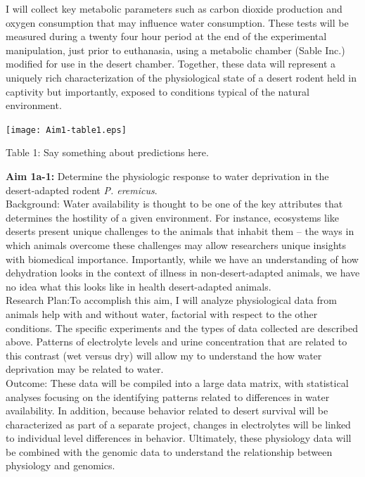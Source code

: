 \documentclass[11pt]{article}
\begin{document}
I will collect key metabolic parameters such as carbon dioxide production and oxygen consumption that may influence water consumption. These tests will be measured during a twenty four hour period at the end of the experimental manipulation, just prior to euthanasia, using a metabolic chamber (Sable Inc.) modified for use in the desert chamber. Together, these data will represent a uniquely rich characterization of the physiological state of a desert rodent held in captivity but importantly, exposed to conditions typical of the natural environment. \\


  \begin{center}
    \texttt{[image: Aim1-table1.eps]}
  \end{center}  

\noindent \small{Table 1: Say something about predictions here.}

\vspace{5mm}


\noindent \textbf{Aim 1a-1:} Determine the physiologic response to water deprivation in the desert-adapted rodent \textit{P. eremicus}. \\


Background: Water availability is thought to be one of the key attributes that determines the hostility of a given environment. For instance, ecosystems like deserts present unique challenges to the animals that inhabit them -- the ways in which animals overcome these challenges may allow researchers unique insights with biomedical importance. Importantly, while we have an understanding of how dehydration looks in the context of illness in non-desert-adapted animals, we have no idea what this looks like in health desert-adapted animals. \\


Research Plan:To accomplish this aim, I will analyze physiological data from animals help with and without water, factorial with respect to the other conditions. The specific experiments and the types of data collected are described above. Patterns of electrolyte levels and urine concentration that are related to this contrast (wet versus dry) will allow my to understand the how water deprivation may be related to water.   \\

Outcome: These data will be compiled into a large data matrix, with statistical analyses focusing on the identifying patterns related to differences in water availability. In addition, because behavior related to desert survival will be characterized as part of a separate project, changes in electrolytes will be linked to individual level differences in behavior. Ultimately, these physiology data will be combined with the genomic data to understand the relationship between physiology and genomics. \\
\end{document}
